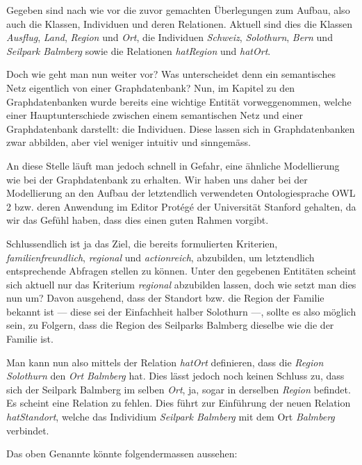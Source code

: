 Gegeben sind nach wie vor die zuvor gemachten Überlegungen zum Aufbau, also auch die Klassen, Individuen und deren Relationen. Aktuell sind dies die Klassen \textit{Ausflug}, \textit{Land}, \textit{Region} und \textit{Ort}, die Individuen \textit{Schweiz}, \textit{Solothurn}, \textit{Bern} und \textit{Seilpark Balmberg} sowie die Relationen \textit{hatRegion} und \textit{hatOrt}.

Doch wie geht man nun weiter vor? Was unterscheidet denn ein semantisches Netz eigentlich von einer Graphdatenbank? Nun, im Kapitel zu den Graphdatenbanken wurde bereits eine wichtige Entität vorweggenommen, welche einer Hauptunterschiede zwischen einem semantischen Netz und einer Graphdatenbank darstellt: die Individuen. Diese lassen sich in Graphdatenbanken zwar abbilden, aber viel weniger intuitiv und sinngemäss.

An diese Stelle läuft man jedoch schnell in Gefahr, eine ähnliche Modellierung wie bei der Graphdatenbank zu erhalten. Wir haben uns daher bei der Modellierung an den Aufbau der letztendlich verwendeten Ontologiesprache OWL 2 bzw. deren Anwendung im Editor Protégé der Universität Stanford gehalten, da wir das Gefühl haben, dass dies einen guten Rahmen vorgibt.

Schlussendlich ist ja das Ziel, die bereits formulierten Kriterien, \textit{familienfreundlich}, \textit{regional} und \textit{actionreich}, abzubilden, um letztendlich entsprechende Abfragen stellen zu können. Unter den gegebenen Entitäten scheint sich aktuell nur das Kriterium \textit{regional} abzubilden lassen, doch wie setzt man dies nun um? Davon ausgehend, dass der Standort bzw. die Region der Familie bekannt ist --- diese sei der Einfachheit halber Solothurn ---, sollte es also möglich sein, zu Folgern, dass die Region des Seilparks Balmberg dieselbe wie die der Familie ist.

Man kann nun also mittels der Relation \textit{hatOrt} definieren, dass die \textit{Region} \textit{Solothurn} den \textit{Ort} \textit{Balmberg} hat. Dies lässt jedoch noch keinen Schluss zu, dass sich der Seilpark Balmberg im selben \textit{Ort}, ja, sogar in derselben \textit{Region} befindet. Es scheint eine Relation zu fehlen. Dies führt zur Einführung der neuen Relation \textit{hatStandort}, welche das Individium \textit{Seilpark Balmberg} mit dem Ort \textit{Balmberg} verbindet.

\newpage

Das oben Genannte könnte folgendermassen aussehen:

